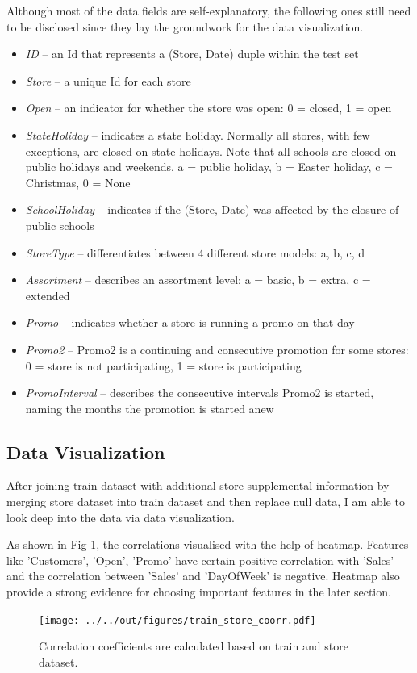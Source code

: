 \documentclass[11pt, a4paper, leqno]{article}
\begin{document}
Although most of the data fields are self-explanatory, the following ones still need to be disclosed since they lay the groundwork for the data visualization.

\begin{itemize}

    \item \textit{ID} -- an Id that represents a (Store, Date) duple within the test set
    \item \textit{Store} -- a unique Id for each store
    \item \textit{Open} -- an indicator for whether the store was open: 0 = closed, 1 = open
    \item \textit{StateHoliday} -- indicates a state holiday. Normally all stores, with few exceptions, are closed on state holidays. Note that all schools are closed on public holidays and weekends. a = public holiday, b = Easter holiday, c = Christmas, 0 = None
    \item \textit{SchoolHoliday} -- indicates if the (Store, Date) was affected by the closure of public schools
    \item \textit{StoreType} -- differentiates between 4 different store models: a, b, c, d
    \item \textit{Assortment} -- describes an assortment level: a = basic, b = extra, c = extended
    \item \textit{Promo} -- indicates whether a store is running a promo on that day
    \item \textit{Promo2} -- Promo2 is a continuing and consecutive promotion for some stores: 0 = store is not participating, 1 = store is participating
    \item \textit{PromoInterval} -- describes the consecutive intervals Promo2 is started, naming the months the promotion is started anew

\end{itemize}

\subsection{Data Visualization}

After joining train dataset with additional store supplemental information by merging store dataset into train dataset and then replace null data, I am able to look deep into the data via data visualization.

As shown in Fig \ref{fig:Correlation}, the correlations visualised with the help of heatmap. Features like 'Customers', 'Open', 'Promo' have certain positive correlation with 'Sales' and the correlation between 'Sales' and 'DayOfWeek' is negative. Heatmap also provide a strong evidence for choosing important features in the later section.
\begin{figure}[ht]
\centering
\texttt{[image: ../../out/figures/train\_store\_coorr.pdf]}
\caption{Correlation coefficients are calculated based on train and store dataset.}
\label{fig:Correlation}
\end{figure}
\end{document}
